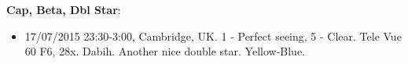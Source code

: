 {\bf Cap, Beta, Dbl Star}:
\begin{itemize}
\item 17/07/2015 23:30-3:00, Cambridge, UK. 1 - Perfect seeing, 5 - Clear. Tele Vue 60 F6, 28x. Dabih. Another nice double star. Yellow-Blue.
\end{itemize}
